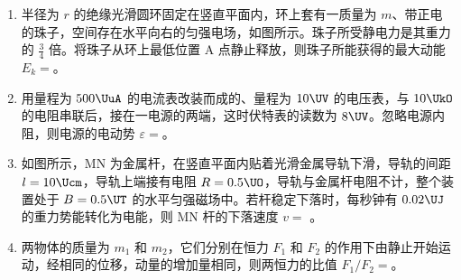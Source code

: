 \documentclass[\gkver]{gaokaozhenti}
\begin{document}
\begin{enumerate}


\item
半径为 $r$ 的绝缘光滑圆环固定在竖直平面内，环上套有一质量为 $m$、带正电的珠子，空间存在水平向右的匀强电场，如图所示。珠子所受静电力是其重力的 $\frac{3}{4}$ 倍。将珠子从环上最低位置 A 点静止释放，则珠子所能获得的最大动能 $E_{k} =$。
\onepicture[align=right, w=4.12cm]{}



\item
用量程为 $500\UuA$ 的电流表改装而成的、量程为 $10\UV$ 的电压表，与 $10\UkO$ 的电阻串联后，接在一电源的两端，这时伏特表的读数为 $8\UV$。忽略电源内阻，则电源的电动势 $\varepsilon =$\tkanswer[1.8cm]{$12\UV$}。

\jdanswer{
$12\UV$
}


\item
如图所示，MN 为金属杆，在竖直平面内贴着光滑金属导轨下滑，导轨的间距 $l = 10\Ucm$，导轨上端接有电阻 $R = 0.5\UO$，导轨与金属杆电阻不计，整个装置处于 $B = 0.5\UT$ 的水平匀强磁场中。若杆稳定下落时，每秒钟有 $0.02\UJ$ 的重力势能转化为电能，则 MN 杆的下落速度 $v =$ \tkanswer[1.8cm]{$2\Ums$}。
\onepicture[align=right, h=3.72cm]{}

\jdanswer{
$2\Ums$
}


\item
两物体的质量为 $m_{1}$ 和 $m_{2}$，它们分别在恒力 $F_{1}$ 和 $F_{2}$ 的作用下由静止开始运动，经相同的位移，动量的增加量相同，则两恒力的比值 $F_{1}/F_{2} =$。


\end{enumerate}
\end{document}
